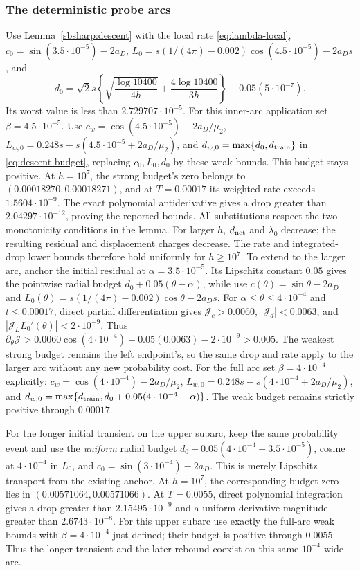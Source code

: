 \documentclass[10pt]{article}
\theoremstyle{remark}\newtheorem{remark}[theorem]{Remark}
\begin{document}
\subsubsection{The deterministic probe arcs}


Use Lemma~\ref{sbsharp:descent} with the local rate \eqref{eq:lambda-local},
$c_0=\sin(3.5\cdot10^{-5})-2a_D$,
$L_0=s(1/(4\pi)-0.002)\cos(4.5\cdot10^{-5})-2a_Ds$,
and
\[
 d_0=\sqrt2s\left\{\sqrt{\frac{\log10400}{4h}}
        +\frac{4\log10400}{3h}\right\}+0.05(5\cdot10^{-7}).
\]
Its worst value is less than $2.729707\cdot10^{-5}$.
For this inner-arc application set $\beta=4.5\cdot10^{-5}$.
Use $c_w=\cos(4.5\cdot10^{-5})-2a_D/\mu_2$,
$L_{w,0}=0.248s-s(4.5\cdot10^{-5}+2a_D/\mu_2)$,
and $d_{w,0}=\max\{d_0,d_{\rm train}\}$ in
\eqref{eq:descent-budget}, replacing $c_0,L_0,d_0$ by these weak
bounds. This budget stays positive.
At $h=10^7$, the strong budget's zero belongs to
$(0.00018270,0.00018271)$, and at $T=0.00017$ its weighted rate exceeds
$1.5604\cdot10^{-9}$. The exact polynomial antiderivative gives a
drop greater than $2.04297\cdot10^{-12}$, proving the reported bounds.
All substitutions respect the two monotonicity conditions in the lemma.
For larger $h$, $d_{\rm net}$ and $\lambda_0$ decrease; the resulting
residual and displacement charges decrease. The rate and integrated-drop
lower bounds therefore hold uniformly for $h\ge10^7$.
To extend to the larger arc, anchor the initial residual at
$\alpha=3.5\cdot10^{-5}$. Its Lipschitz constant $0.05$ gives the
pointwise radial budget $d_0+0.05(\theta-\alpha)$, while use
$c(\theta)=\sin\theta-2a_D$ and
$L_0(\theta)=s(1/(4\pi)-0.002)\cos\theta-2a_Ds$.
For $\alpha\le\theta\le4\cdot10^{-4}$ and $t\le0.00017$, direct
partial differentiation gives
$\mathcal J_c>0.0060$, $|\mathcal J_d|<0.0063$, and
$|\mathcal J_L L_0'(\theta)|<2\cdot10^{-9}$.
Thus $\partial_\theta\mathcal J>0.0060\cos(4\cdot10^{-4})
-0.05(0.0063)-2\cdot10^{-9}>0.005$.
The weakest strong budget remains the left endpoint's, so the same
drop and rate apply to the larger arc without any new probability cost.
For the full arc set $\beta=4\cdot10^{-4}$ explicitly:
$c_w=\cos(4\cdot10^{-4})-2a_D/\mu_2$,
$L_{w,0}=0.248s-s(4\cdot10^{-4}+2a_D/\mu_2)$, and
$d_{w,0}=\max\{d_{\rm train},d_0+0.05(4\cdot10^{-4}-\alpha)\}$.
The weak budget remains strictly positive through $0.00017$.

For the longer initial transient on the upper subarc, keep the same
probability event and use the \emph{uniform} radial budget
$d_0+0.05(4\cdot10^{-4}-3.5\cdot10^{-5})$, cosine at
$4\cdot10^{-4}$ in $L_0$, and $c_0=\sin(3\cdot10^{-4})-2a_D$.
This is merely Lipschitz transport from the existing anchor.
At $h=10^7$, the corresponding budget zero lies in $(0.00571064,0.00571066)$.
At $T=0.0055$, direct polynomial integration gives a drop greater than
$2.15495\cdot10^{-9}$ and a uniform derivative magnitude greater than
$2.6743\cdot10^{-8}$. For this upper subarc use exactly the full-arc weak bounds with
$\beta=4\cdot10^{-4}$ just defined; their budget is positive through
$0.0055$. Thus the longer
transient and the later rebound coexist on this same $10^{-4}$-wide arc.
\end{document}

